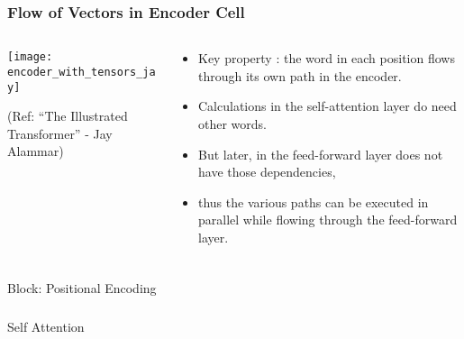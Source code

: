 \begin{frame}[fragile]\frametitle{Flow of Vectors in Encoder Cell}


\begin{columns}
    \begin{column}[T]{0.5\linewidth}
\begin{center}
\texttt{[image: encoder\_with\_tensors\_jay]}


{\tiny (Ref: ``The Illustrated Transformer'' - Jay Alammar)}
\end{center}		

		\end{column}
    \begin{column}[T]{0.5\linewidth}
\begin{itemize}
\item Key property : the word in each position flows through its own path in the encoder. 
\item Calculations in the self-attention layer do need other words. 
\item But later, in the feed-forward layer does not have those dependencies, \item thus the various paths can be executed in parallel while flowing through the feed-forward layer.
\end{itemize}
    \end{column}
  \end{columns}
\end{frame}



\begin{frame}[fragile]\frametitle{}
\begin{center}
{\Large Block: Positional Encoding}
\end{center}
\end{frame}

\begin{frame}[fragile]\frametitle{}
\begin{center}
{\Large Self Attention}
\end{center}
\end{frame}





